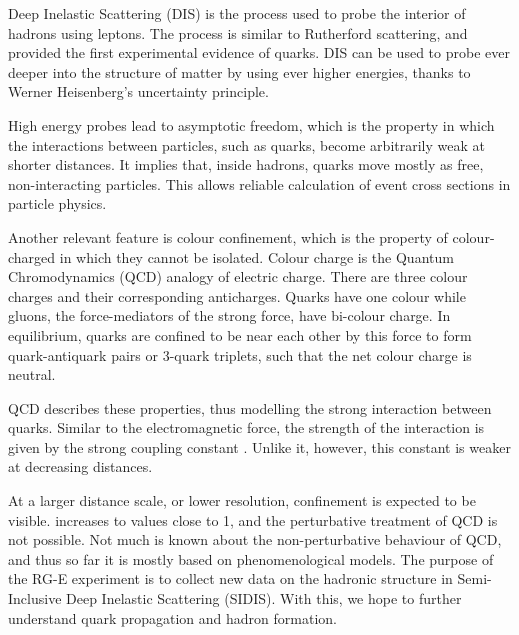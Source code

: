     Deep Inelastic Scattering (DIS) is the process used to probe the interior of hadrons using leptons.
    The process is similar to Rutherford scattering, and provided the first experimental evidence of quarks.
    DIS can be used to probe ever deeper into the structure of matter by using ever higher energies, thanks to Werner Heisenberg's uncertainty principle.

    High energy probes lead to asymptotic freedom, which is the property in which the interactions between particles, such as quarks, become arbitrarily weak at shorter distances.
    It implies that, inside hadrons, quarks move mostly as free, non-interacting particles.
    This allows reliable calculation of event cross sections in particle physics.

    Another relevant feature is colour confinement, which is the property of colour-charged in which they cannot be isolated.
    Colour charge is the Quantum Chromodynamics (QCD) analogy of electric charge.
    There are three colour charges and their corresponding anticharges.
    Quarks have one colour while gluons, the force-mediators of the strong force, have bi-colour charge.
    In equilibrium, quarks are confined to be near each other by this force to form quark-antiquark pairs or 3-quark triplets, such that the net colour charge is neutral.

    QCD describes these properties, thus modelling the strong interaction between quarks.
    Similar to the electromagnetic force, the strength of the interaction is given by the strong coupling constant \textalpha.
    Unlike it, however, this constant is weaker at decreasing distances.

    At a larger distance scale, or lower resolution, confinement is expected to be visible.
    \textalpha increases to values close to 1, and the perturbative treatment of QCD is not possible.
    Not much is known about the non-perturbative behaviour of QCD, and thus so far it is mostly based on phenomenological models.
    The purpose of the RG-E experiment is to collect new data on the hadronic structure in Semi-Inclusive Deep Inelastic Scattering (SIDIS).
    With this, we hope to further understand quark propagation and hadron formation.

    
    
    
